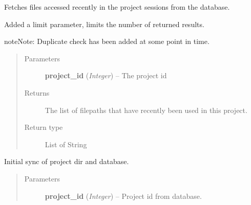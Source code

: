 \documentclass[letterpaper,10pt,english]{sphinxmanual}
\begin{document}

\begin{fulllineitems}
\label{controller:controller.project.get_recent_files}
Fetches files accessed recently in the project sessions from the database.

Added a limit parameter, limits the number of returned results.

\begin{notice}{note}{Note:}
Duplicate check has been added at some point in time.
\end{notice}
\begin{quote}\begin{description}
\item[{Parameters}] \leavevmode
\textbf{project\_id} (\emph{Integer}) -- The project id

\item[{Returns}] \leavevmode
The list of filepaths that have recently been used in this project.

\item[{Return type}] \leavevmode
List of String

\end{description}\end{quote}

\end{fulllineitems}


\begin{fulllineitems}
\label{controller:controller.project.init_sync_project_directory}
Initial sync of project dir and database.
\begin{quote}\begin{description}
\item[{Parameters}] \leavevmode
\textbf{project\_id} (\emph{Integer}) -- Project id from database.

\end{description}\end{quote}

\end{fulllineitems}

\end{document}
